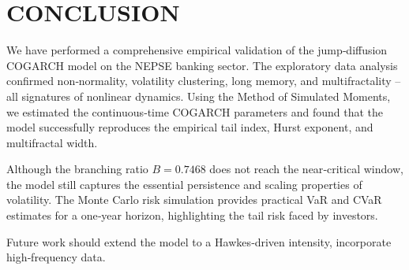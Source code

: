 \chapter{CONCLUSION}
We have performed a comprehensive empirical validation of the jump‑diffusion COGARCH model on the NEPSE banking sector. The exploratory data analysis confirmed non‑normality, volatility clustering, long memory, and multifractality – all signatures of nonlinear dynamics. Using the Method of Simulated Moments, we estimated the continuous‑time COGARCH parameters and found that the model successfully reproduces the empirical tail index, Hurst exponent, and multifractal width.

Although the branching ratio $B=0.7468$ does not reach the near‑critical window, the model still captures the essential persistence and scaling properties of volatility. The Monte Carlo risk simulation provides practical VaR and CVaR estimates for a one‑year horizon, highlighting the tail risk faced by investors.

Future work should extend the model to a Hawkes‑driven intensity, incorporate high‑frequency data.
